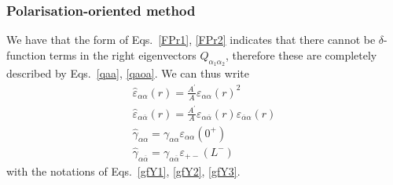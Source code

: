 \documentclass[pre,aps,superscriptaddress,nofootinbib]{revtex4}
\begin{document}
\subsubsection{Polarisation-oriented method}

We have that the form of Eqs.~\ref{FPr1}, \ref{FPr2} indicates that there cannot be $\delta$-function terms in the right eigenvectors $Q_{\alpha_1\alpha_2}$, therefore these are completely described by Eqs.~\ref{qaa}, \ref{qaoa}. We can thus write
\begin{eqnarray}
\hat{\varepsilon}_{\alpha\alpha}(r) = \frac{A^{\prime}}{A} \varepsilon_{\alpha\alpha}(r)^2\\
\hat{\varepsilon}_{\alpha\overline{\alpha}}(r) = \frac{A^{\prime}}{A} \varepsilon_{\alpha\overline{\alpha}}(r) \varepsilon_{\overline{\alpha}\alpha}(r)\\
\hat{\gamma}_{\alpha\alpha} = \gamma_{\alpha\alpha} \varepsilon_{\alpha\alpha}(0^+)\\
\hat{\gamma}_{\alpha\overline{\alpha}} = \gamma_{\alpha\overline{\alpha}} \varepsilon_{+-}(L^-)
\end{eqnarray}
with the notations of Eqs.~\ref{gfY1}, \ref{gfY2}, \ref{gfY3}.\\
\end{document}
